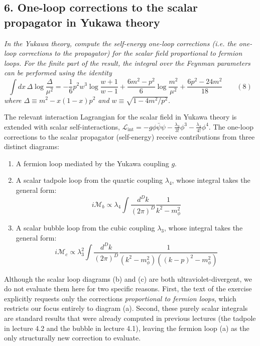 \subsection*{6. One-loop corrections to the scalar propagator in Yukawa theory}

\begin{center}
    \textit{In the Yukawa theory, compute the self-energy one-loop corrections (i.e. the one-loop corrections to the propagator) for the scalar field proportional to fermion loops. For the finite part of the result, the integral over the Feynman parameters can be performed using the identity}
    \[
        \int dx \, \Delta \log \frac{\Delta}{\mu^2} = -\frac{1}{6} p^2 w^3 \log \frac{w+1}{w-1} + \frac{6m^2 - p^2}{6} \log \frac{m^2}{\mu^2} + \frac{6p^2 - 24m^2}{18} \qquad (8)
    \]
    \textit{where $\Delta \equiv m^2 - x(1-x)p^2$ and $w \equiv \sqrt{1 - 4m^2/p^2}$.}
\end{center}

The relevant interaction Lagrangian for the scalar field in Yukawa theory is extended with scalar self-interactions, $\mathcal{L}_{\text{int}} = -g\phi\bar{\psi}\psi - \frac{\lambda_3}{3!}\phi^3 - \frac{\lambda_4}{4!}\phi^4$. The one-loop corrections to the scalar propagator (self-energy) receive contributions from three distinct diagrams:
\begin{enumerate}[label=\alph*)]
    \item A fermion loop mediated by the Yukawa coupling $g$.
    \item A scalar tadpole loop from the quartic coupling $\lambda_4$, whose integral takes the general form:
          \[
              i\mathcal{M}_b \propto \lambda_4 \int \frac{d^D k}{(2\pi)^D} \frac{1}{k^2 - m_\phi^2}
          \]
    \item A scalar bubble loop from the cubic coupling $\lambda_3$, whose integral takes the general form:
          \[
              i\mathcal{M}_c \propto \lambda_3^2 \int \frac{d^D k}{(2\pi)^D} \frac{1}{(k^2 - m_\phi^2)((k-p)^2 - m_\phi^2)}
          \]
\end{enumerate}
Although the scalar loop diagrams (b) and (c) are both ultraviolet-divergent, we do not evaluate them here for two specific reasons. First, the text of the exercise explicitly requests only the corrections \textit{proportional to fermion loops}, which restricts our focus entirely to diagram (a). Second, these purely scalar integrals are standard results that were already computed in previous lectures (the tadpole in lecture 4.2 and the bubble in lecture 4.1), leaving the fermion loop (a) as the only structurally new correction to evaluate.

